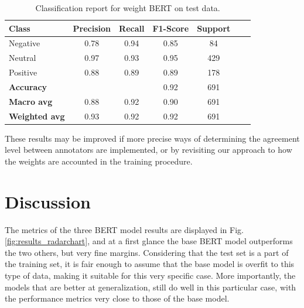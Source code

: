 \documentclass[conference]{IEEEtran}
\begin{document}
\begin{table}[H]
\centering
\caption{Classification report for weight BERT on test data.}
\label{cr_wbert_test}
\begin{tabular}{lcccccc}
\toprule
\textbf{Class} & \textbf{Precision} & \textbf{Recall} & \textbf{F1-Score} & \textbf{Support} \\
\midrule
Negative & 0.78 & 0.94 & 0.85 & 84 \\
Neutral & 0.97 & 0.93 & 0.95 & 429 \\
Positive & 0.88 & 0.89 & 0.89 & 178 \\
\midrule
\textbf{Accuracy} &  &  & 0.92 & 691 \\
\textbf{Macro avg} & 0.88 & 0.92 & 0.90 & 691 \\
\textbf{Weighted avg} & 0.93 & 0.92 & 0.92 & 691 \\
\bottomrule
\end{tabular}
\end{table}

These results may be improved if more precise ways of determining the agreement level between annotators are implemented, or by revisiting our approach to how the weights are accounted in the training procedure.


\section{Discussion}

The metrics of the three BERT model 
results are displayed in Fig. \ref{fig:results_radarchart}, and at a first glance the base BERT model outperforms the two others, but very fine margins. Considering that the test set is a part of the training set, it is fair enough to assume that the base model is overfit to this type of data, making it suitable for this very specific case. More importantly, the models that are better at generalization, still do well in this particular case, with the performance metrics very close to those of the base model.
\end{document}
